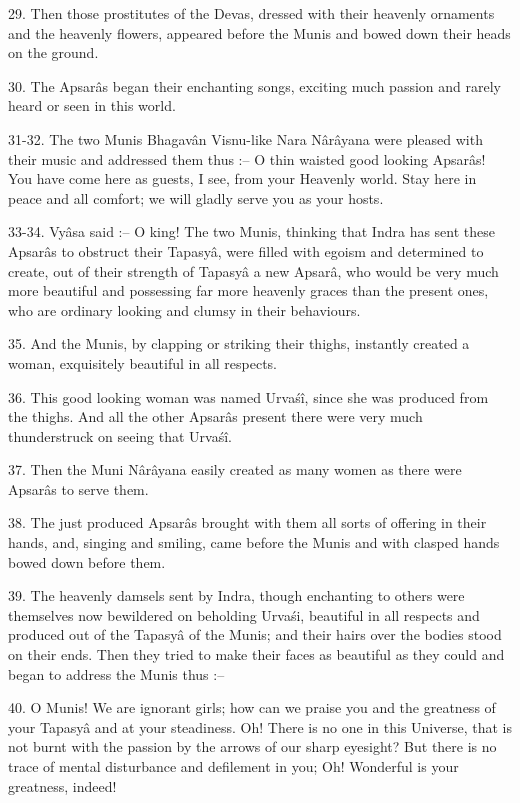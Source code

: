 29. Then those prostitutes of the Devas, dressed with their heavenly ornaments and the heavenly flowers, appeared before the Munis and bowed down their heads on the ground.

30. The Apsar\^as began their enchanting songs, exciting much passion and rarely heard or seen in this world.

31-32. The two Munis Bhagav\^an Visnu-like Nara N\^ar\^ayana were pleased with their music and addressed them thus :-- O thin waisted good looking Apsar\^as! You have come here as guests, I see, from your Heavenly world. Stay here in peace and all comfort; we will gladly serve you as your hosts.

33-34. Vy\^asa said :-- O king! The two Munis, thinking that Indra has sent these Apsar\^as to obstruct their Tapasy\^a, were filled with egoism and determined to create, out of their strength of Tapasy\^a a new Apsar\^a, who would be very much more beautiful and possessing far more heavenly graces than the present ones, who are ordinary looking and clumsy in their behaviours.

35. And the Munis, by clapping or striking their thighs, instantly created a woman, exquisitely beautiful in all respects.

36. This good looking woman was named Urva\'s\^i, since she was produced from the thighs. And all the other Apsar\^as present there were very much thunderstruck on seeing that Urva\'s\^i.

37. Then the Muni N\^ar\^ayana easily created as many women as there were Apsar\^as to serve them.

38. The just produced Apsar\^as brought with them all sorts of offering in their hands, and, singing and smiling, came before the Munis and with clasped hands bowed down before them.

39. The heavenly damsels sent by Indra, though enchanting to others were themselves now bewildered on beholding Urva\'si, beautiful in all respects and produced out of the Tapasy\^a of the Munis; and their hairs over the bodies stood on their ends. Then they tried to make their faces as beautiful as they could and began to address the Munis thus :--

40. O Munis! We are ignorant girls; how can we praise you and the greatness of your Tapasy\^a and at your steadiness. Oh! There is no one in this Universe, that is not burnt with the passion by the arrows of our sharp eyesight? But there is no trace of mental disturbance and defilement in you; Oh! Wonderful is your greatness, indeed!

